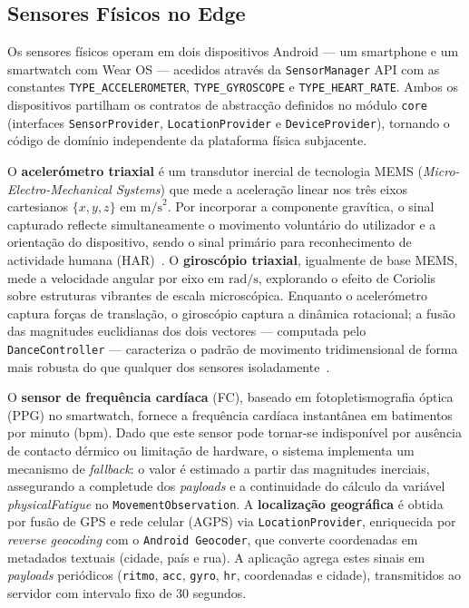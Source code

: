 \documentclass[runningheads]{llncs}
\begin{document}
\subsection{Sensores Físicos no Edge}
Os sensores físicos operam em dois dispositivos Android --- um smartphone e um smartwatch com Wear OS --- acedidos através da \texttt{SensorManager} API com as constantes \texttt{TYPE\_ACCELEROMETER}, \texttt{TYPE\_GYROSCOPE} e \texttt{TYPE\_HEART\_RATE}. Ambos os dispositivos partilham os contratos de abstracção definidos no módulo \texttt{core} (interfaces \texttt{SensorProvider}, \texttt{LocationProvider} e \texttt{DeviceProvider}), tornando o código de domínio independente da plataforma física subjacente.

O \textbf{acelerómetro triaxial} é um transdutor inercial de tecnologia MEMS (\textit{Micro-Electro-Mechanical Systems}) que mede a aceleração linear nos três eixos cartesianos $\{x, y, z\}$ em $\mathrm{m/s}^2$. Por incorporar a componente gravítica, o sinal capturado reflecte simultaneamente o movimento voluntário do utilizador e a orientação do dispositivo, sendo o sinal primário para reconhecimento de actividade humana (HAR)~\cite{hossen2025}. O \textbf{giroscópio triaxial}, igualmente de base MEMS, mede a velocidade angular por eixo em $\mathrm{rad/s}$, explorando o efeito de Coriolis sobre estruturas vibrantes de escala microscópica. Enquanto o acelerómetro captura forças de translação, o giroscópio captura a dinâmica rotacional; a fusão das magnitudes euclidianas dos dois vectores --- computada pelo \texttt{DanceController} --- caracteriza o padrão de movimento tridimensional de forma mais robusta do que qualquer dos sensores isoladamente~\cite{paraschiakos2020}.

O \textbf{sensor de frequência cardíaca} (FC), baseado em fotopletismografia óptica (PPG) no smartwatch, fornece a frequência cardíaca instantânea em batimentos por minuto (bpm). Dado que este sensor pode tornar-se indisponível por ausência de contacto dérmico ou limitação de hardware, o sistema implementa um mecanismo de \emph{fallback}: o valor é estimado a partir das magnitudes inerciais, assegurando a completude dos \textit{payloads} e a continuidade do cálculo da variável \emph{physicalFatigue} no \texttt{MovementObservation}. A \textbf{localização geográfica} é obtida por fusão de GPS e rede celular (AGPS) via \texttt{LocationProvider}, enriquecida por \emph{reverse geocoding} com o \texttt{Android Geocoder}, que converte coordenadas em metadados textuais (cidade, país e rua). A aplicação agrega estes sinais em \textit{payloads} periódicos (\texttt{ritmo}, \texttt{acc}, \texttt{gyro}, \texttt{hr}, coordenadas e cidade), transmitidos ao servidor com intervalo fixo de 30 segundos.
\end{document}
